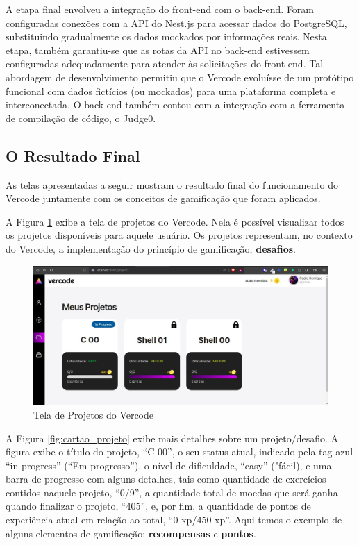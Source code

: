 \documentclass[12pt]{article}
\begin{document}
A etapa final envolveu a integração do front-end com o back-end. Foram configuradas conexões com a API do Nest.js para acessar dados do PostgreSQL, substituindo gradualmente os dados mockados por informações reais. Nesta etapa, também garantiu-se que as rotas da API no back-end estivessem configuradas adequadamente para atender às solicitações do front-end. Tal abordagem de desenvolvimento permitiu que o Vercode evoluísse de um protótipo funcional com dados fictícios (ou mockados) para uma plataforma completa e interconectada. O back-end também contou com a integração com a ferramenta de compilação de código, o Judge0. 

\subsection{O Resultado Final} \label{sec:resultado_final}

As telas apresentadas a seguir mostram o resultado final do funcionamento do Vercode juntamente com os conceitos de gamificação que foram aplicados. 

A Figura \ref{fig:projetos} exibe a tela de projetos do Vercode. Nela é possível visualizar todos os projetos disponíveis para aquele usuário. Os projetos representam, no contexto do Vercode, a implementação do princípio de gamificação, \textbf{desafios}.

\begin{figure}[ht!]
\centering
\includegraphics[width=1.0\textwidth]{imagens/tela_projetos.jpg}
\caption{Tela de Projetos do Vercode}
\label{fig:projetos}
\end{figure}

A Figura \ref{fig:cartao_projeto} exibe mais detalhes sobre um projeto/desafio. A figura exibe o título do projeto, “C 00”, o seu status atual, indicado pela tag azul “in progress” (“Em progresso”), o nível de dificuldade, “easy” ("fácil), e uma barra de progresso com alguns detalhes, tais como quantidade de exercícios contidos naquele projeto, “0/9”, a quantidade total de moedas que será ganha quando finalizar o projeto, “405”, e, por fim, a quantidade de pontos de experiência atual em relação ao total, “0 xp/450 xp”. Aqui temos o exemplo de alguns elementos de gamificação: \textbf{recompensas} e \textbf{pontos}.
\end{document}
